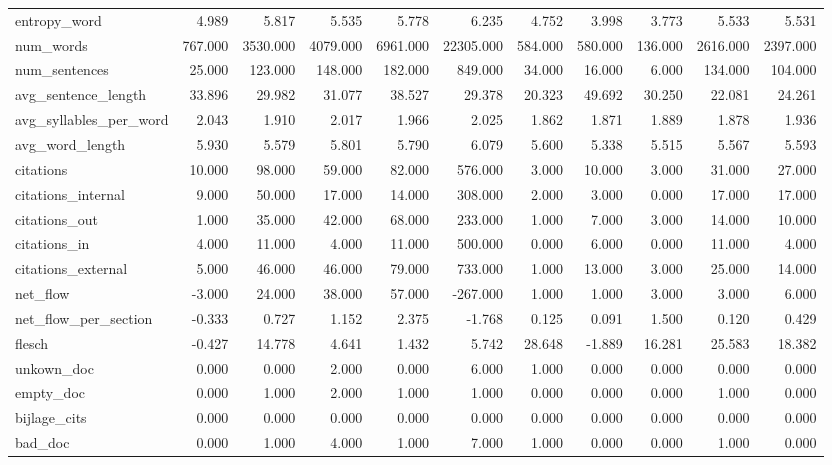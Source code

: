 \begin{tabular}{lrrrrrrrrrr}
\cline{1-11}
entropy\_word & 4.989 & 5.817 & 5.535 & 5.778 & 6.235 & 4.752 & 3.998 & 3.773 & 5.533 & 5.531 \\
\cline{1-11}
num\_words & 767.000 & 3530.000 & 4079.000 & 6961.000 & 22305.000 & 584.000 & 580.000 & 136.000 & 2616.000 & 2397.000 \\
\cline{1-11}
num\_sentences & 25.000 & 123.000 & 148.000 & 182.000 & 849.000 & 34.000 & 16.000 & 6.000 & 134.000 & 104.000 \\
\cline{1-11}
avg\_sentence\_length & 33.896 & 29.982 & 31.077 & 38.527 & 29.378 & 20.323 & 49.692 & 30.250 & 22.081 & 24.261 \\
\cline{1-11}
avg\_syllables\_per\_word & 2.043 & 1.910 & 2.017 & 1.966 & 2.025 & 1.862 & 1.871 & 1.889 & 1.878 & 1.936 \\
\cline{1-11}
avg\_word\_length & 5.930 & 5.579 & 5.801 & 5.790 & 6.079 & 5.600 & 5.338 & 5.515 & 5.567 & 5.593 \\
\cline{1-11}
citations & 10.000 & 98.000 & 59.000 & 82.000 & 576.000 & 3.000 & 10.000 & 3.000 & 31.000 & 27.000 \\
\cline{1-11}
citations\_internal & 9.000 & 50.000 & 17.000 & 14.000 & 308.000 & 2.000 & 3.000 & 0.000 & 17.000 & 17.000 \\
\cline{1-11}
citations\_out & 1.000 & 35.000 & 42.000 & 68.000 & 233.000 & 1.000 & 7.000 & 3.000 & 14.000 & 10.000 \\
\cline{1-11}
citations\_in & 4.000 & 11.000 & 4.000 & 11.000 & 500.000 & 0.000 & 6.000 & 0.000 & 11.000 & 4.000 \\
\cline{1-11}
citations\_external & 5.000 & 46.000 & 46.000 & 79.000 & 733.000 & 1.000 & 13.000 & 3.000 & 25.000 & 14.000 \\
\cline{1-11}
net\_flow & -3.000 & 24.000 & 38.000 & 57.000 & -267.000 & 1.000 & 1.000 & 3.000 & 3.000 & 6.000 \\
\cline{1-11}
net\_flow\_per\_section & -0.333 & 0.727 & 1.152 & 2.375 & -1.768 & 0.125 & 0.091 & 1.500 & 0.120 & 0.429 \\
\cline{1-11}
flesch & -0.427 & 14.778 & 4.641 & 1.432 & 5.742 & 28.648 & -1.889 & 16.281 & 25.583 & 18.382 \\
\cline{1-11}
unkown\_doc & 0.000 & 0.000 & 2.000 & 0.000 & 6.000 & 1.000 & 0.000 & 0.000 & 0.000 & 0.000 \\
\cline{1-11}
empty\_doc & 0.000 & 1.000 & 2.000 & 1.000 & 1.000 & 0.000 & 0.000 & 0.000 & 1.000 & 0.000 \\
\cline{1-11}
bijlage\_cits & 0.000 & 0.000 & 0.000 & 0.000 & 0.000 & 0.000 & 0.000 & 0.000 & 0.000 & 0.000 \\
\cline{1-11}
bad\_doc & 0.000 & 1.000 & 4.000 & 1.000 & 7.000 & 1.000 & 0.000 & 0.000 & 1.000 & 0.000 \\
\cline{1-11}
\bottomrule
\end{tabular}
